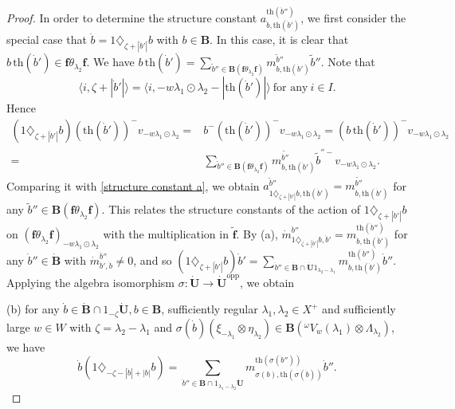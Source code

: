 \documentclass[10pt,a4paper]{amsart}
\begin{document}
\begin{proof}
In order to determine the structure constant $a_{\dot{b},\mathrm{th}(\dot{b}')}^{\mathrm{th}(\dot{b}'')}$, we first consider the special case that $\dot{b}=1\diamondsuit_{\zeta+|\dot{b}'|}b$ with $b\in \mathbf{B}$. In this case, it is clear that $b\,\mathrm{th}(\dot{b}')\in \mathbf{f}\theta_{\lambda_2}\mathbf{f}$. We have $b\,\mathrm{th}(\dot{b}')=\sum_{\tilde{b}''\in \mathbf{B}(\mathbf{f}\theta_{\lambda_2}\mathbf{f})}m_{b,\mathrm{th}(\dot{b}')}^{\tilde{b}''}\tilde{b}''$. Note that
\begin{equation}\label{weight relation}
\langle i,\zeta+|\dot{b}'|\rangle=\langle i,-w\lambda_1\odot\lambda_2-|\mathrm{th}(\dot{b}')|\rangle\ \textrm{for any}\ i\in I.   
\end{equation}
Hence 
\begin{align*}
(1\diamondsuit_{\zeta+|\dot{b}'|}b)(\mathrm{th}(\dot{b}'))^-v_{-w\lambda_1\odot\lambda_2}=&b^-(\mathrm{th}(\dot{b}'))^-v_{-w\lambda_1\odot\lambda_2}
=(b\,\mathrm{th}(\dot{b}'))^-v_{-w\lambda_1\odot\lambda_2}\\
=&\sum_{\tilde{b}''\in \mathbf{B}(\mathbf{f}\theta_{\lambda_2}\mathbf{f})}m_{b,\mathrm{th}(\dot{b}')}^{\tilde{b''}}\tilde{b}^{''-}v_{-w\lambda_1\odot\lambda_2}.
\end{align*}
Comparing it with \eqref{structure constant a}, we obtain $a_{1\diamondsuit_{\zeta+|\dot{b}'|}b,\mathrm{th}(\dot{b}')}^{\tilde{b}''}=m_{b,\mathrm{th}(\dot{b}')}^{\tilde{b''}}$ for any $\tilde{b}''\in \mathbf{B}(\mathbf{f}\theta_{\lambda_2}\mathbf{f})$. This relates the structure constants of the action of $1\diamondsuit_{\zeta+|\dot{b}'|}b$ on $(\mathbf{f}\theta_{\lambda_2}\mathbf{f})_{-w\lambda_1\odot\lambda_2}$ with the multiplication in $\tilde{\mathbf{f}}$. By (a), $\dot{m}_{1\diamondsuit_{\zeta+|\dot{b}'|}b,\dot{b}'}^{\dot{b}''}=m_{b,\mathrm{th}(\dot{b}')}^{\mathrm{th}(\dot{b}'')}$ for any $\dot{b}'' \in \dot{\mathbf{B}}$ with $\dot{m}_{\dot{b}',\dot{b}}^{\dot{b}''}\not=0$, and so $(1\diamondsuit_{\zeta+|\dot{b}'|}b)\dot{b}'=\sum_{\dot{b}''\in \dot{\mathbf{B}}\cap \dot{\mathbf{U}}1_{\lambda_2-\lambda_1}}m_{b,\mathrm{th}(\dot{b}')}^{\mathrm{th}(\dot{b}'')}\dot{b}''$. Applying the algebra isomorphism $\sigma:\dot{\mathbf{U}}\rightarrow \dot{\mathbf{U}}^{\mathrm{opp}}$, we obtain 

(b) for any $\dot{b}\in \dot{\mathbf{B}}\cap 1_{-\zeta}\dot{\mathbf{U}},b\in \mathbf{B}$, sufficiently regular $\lambda_1,\lambda_2\in X^+$ and sufficiently large $w\in W$ with $\zeta=\lambda_2-\lambda_1$ and $\sigma(\dot{b})(\xi_{-\lambda_1}\otimes \eta_{\lambda_2})\in \mathbf{B}({^{\omega}V_w(\lambda_1)\otimes \Lambda_{\lambda_2}})$, we have
$$\dot{b}(1\diamondsuit_{-\zeta-|\dot{b}|+|b|}b)=\sum_{\dot{b}''\in \dot{\mathbf{B}}\cap 1_{\lambda_1-\lambda_2}\dot{\mathbf{U}}}m_{\sigma(b),\mathrm{th}(\sigma(\dot{b}))}^{\mathrm{th}(\sigma(\dot{b}''))}\dot{b}''.$$ 


\end{proof}
\end{document}
